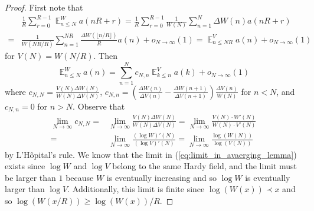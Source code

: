 \documentclass[12pt]{article}
\theoremstyle{plain} %
\theoremstyle{definition} %
\theoremstyle{plain}
\theoremstyle{plain}
\numberwithin{equation}{section}
\renewcommand{\leq}{\leqslant}
\renewcommand{\geq}{\geqslant}
\newcommand{\1}{\mathbbm{1}}
\newcommand{\E}{\operatorname{\mathbb{E}}}
\newcommand{\oo}{\infty}
\begin{document}
\begin{proof}
    First note that 
\begin{align*}
&\frac{1}{R}\sum_{r=0}^{R-1}\E_{n\leq N}^Wa(nR+r) = \frac{1}{R}\sum_{r=0}^{R-1}\frac{1}{W(N)}\sum_{n=1}^N\Delta W(n)a(nR+r)\\ = &\frac{1}{W(NR/R)}\sum_{n=1}^{NR}\frac{\Delta W(\lfloor n/R\rfloor)}{R}a(n)+o_{N\to\oo}(1) = \E_{n\leq NR}^Va(n)+o_{N\to\oo}(1)
\end{align*}
for $V(N) = W(N/R)$. Then
\begin{equation}\label{eq:silverman_toeplitz_application_1}
\E_{n\leq N}^Wa(n) = \sum_{n=1}^Nc_{N,n}\E_{k\leq n}^Va(k)+o_{N\to\oo}(1)
\end{equation}
where $c_{N,N} =\frac{V(N)\Delta W(N)}{W(N)\Delta V(N)}$, $c_{N,n} = \left(\frac{\Delta W(n)}{\Delta V(n)}-\frac{\Delta W(n+1)}{\Delta V(n+1)}\right)\frac{\Delta V(n)}{W(N)}$ for $n<N$, and $c_{N,n} = 0$ for $n>N$. Observe that 
\begin{align}
    \lim_{N\to\oo}c_{N,N} =& \lim_{N\to\oo}\frac{V(N)\Delta W(N)}{W(N)\Delta V(N)} = \lim_{N\to\oo}\frac{V(N)\cdot  W'(N)}{W(N) \cdot V'(N)}\\
    =&\lim_{N\to\oo}\frac{(\log W)'(N)}{(\log V)'(N)} =  \lim_{N\to\oo}\frac{\log (W(N))}{\log (V(N))} \label{eq:limit_in_avaerging_lemma}
\end{align}
by L'H\^opital's rule. We know that the limit in (\ref{eq:limit_in_avaerging_lemma}) exists since $\log W$ and $\log V$ belong to the same Hardy field, and the limit must be larger than $1$ because $W$ is eventually increasing and so $\log W$ is eventually larger than $\log V$. Additionally, this limit is finite since $\log (W(x))\prec x$ and so $\log (W(x/R))\geq \log (W(x))/R$. 



\end{proof}
\end{document}
